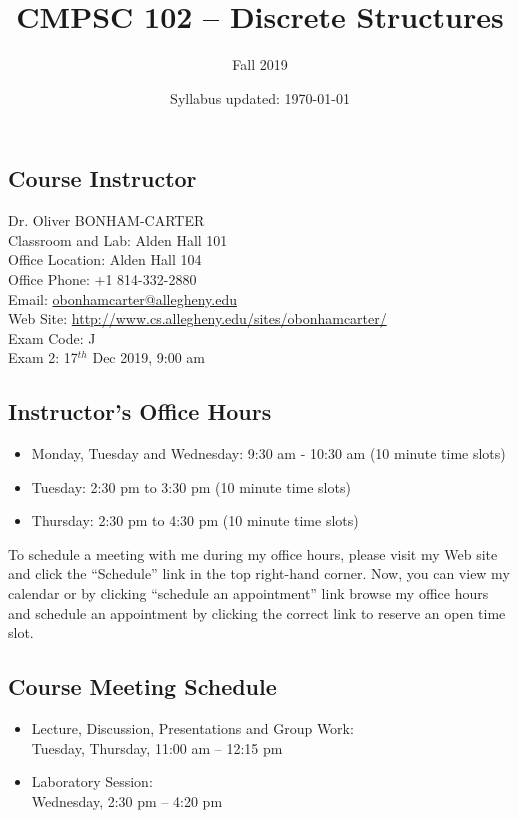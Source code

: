 \documentclass[11pt]{article} %
\title{\textbf{CMPSC 102 -- Discrete Structures}}
\author{Fall 2019}
\date{Syllabus updated: \today} %
\begin{document}
\maketitle

\subsection*{\textbf{Course Instructor}}
Dr. Oliver BONHAM-CARTER\\
\noindent Classroom and Lab: Alden Hall 101 \\
\noindent Office Location: Alden Hall 104 \\
\noindent Office Phone: +1 814-332-2880 \\
\noindent Email: \url{obonhamcarter@allegheny.edu} \\
\noindent Web Site: \url{http://www.cs.allegheny.edu/sites/obonhamcarter/} \\
\noindent Exam Code: J\\
\noindent Exam 2: 17$^{th}$ Dec 2019, 9:00 am

\subsection*{Instructor's Office Hours}


\begin{itemize}
	\itemsep 0em
        \item Monday, Tuesday and Wednesday: 9:30 am - 10:30 am (10 minute time slots)
        \item Tuesday: 2:30 pm to 3:30 pm (10 minute time slots)
        \item Thursday: 2:30 pm to 4:30 pm (10 minute time slots)
\end{itemize}

\noindent
To schedule a meeting with me during my office hours, please visit my Web site and click the ``Schedule'' link in the top right-hand corner. Now, you can view my calendar or by clicking ``schedule an appointment'' link browse my office hours and schedule an appointment by clicking the correct link to reserve an open time slot. 




\subsection*{\textbf{Course Meeting Schedule}}
\begin{itemize}
    \item Lecture, Discussion, Presentations and Group Work:\\
        \indent Tuesday, Thursday, 11:00 am -- 12:15 pm 
    \item Laboratory Session:\\
        \indent Wednesday, 2:30 pm -- 4:20 pm \\
\end{itemize}
\end{document}
